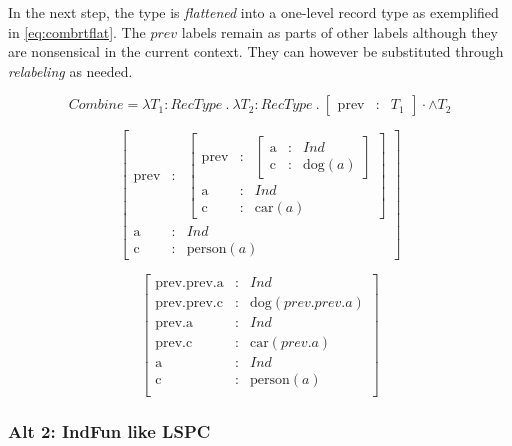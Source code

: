 \documentclass[11pt, a4paper]{article}
\begin{document}
In the next step, the type is \textit{flattened} into a one-level record type as exemplified in \autoref{eq:combrtflat}.
The $prev$ labels remain as parts of other labels although they are nonsensical in the current context.
They can however be substituted through \textit{relabeling} as needed.

\begin{equation}\label{eq:comb}
Combine = \lambda T_1 : RecType \ .\ \lambda T_2 : RecType \ .\
[\begin{array}{rcl} \text{prev} &:& T_1 \end{array}] \cdot\wedge T_2
\end{equation}

\begin{equation}\label{eq:combrt}
\left[\begin{array}{rcl}
\text{prev} &:& \left[\begin{array}{rcl}
	\text{prev} &:& \left[\begin{array}{rcl}
		\text{a} &:& Ind\\
		\text{c} &:& \text{dog}(a)
		\end{array}\right]\\
	\text{a} &:& Ind\\
	\text{c} &:& \text{car}(a)
	\end{array}\right]\\
\text{a} &:& Ind\\
\text{c} &:& \text{person}(a)
\end{array}\right]\end{equation}

\begin{equation}\label{eq:combrtflat}
\left[\begin{array}{rcl}
\text{prev.prev.a} &:& Ind\\
\text{prev.prev.c} &:& \text{dog}(prev.prev.a)\\
\text{prev.a} &:& Ind\\
\text{prev.c} &:& \text{car}(prev.a)\\
\text{a} &:& Ind\\
\text{c} &:& \text{person}(a)\\
\end{array}\right]\end{equation}

\subsubsection{Alt 2: IndFun like LSPC}
\end{document}
